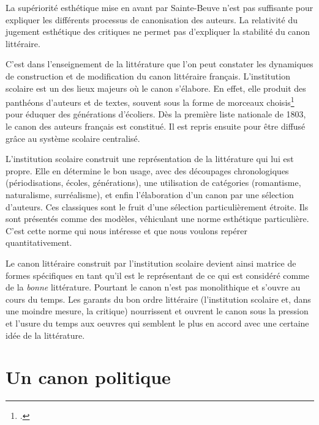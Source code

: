 La supériorité esthétique mise en avant par Sainte-Beuve n'est pas suffisante pour expliquer les différents processus de canonisation des auteurs. La relativité du jugement esthétique des critiques ne permet pas d'expliquer la stabilité du canon littéraire. 

C'est dans l'enseignement de la littérature que l'on peut constater les dynamiques de construction et de modification du canon littéraire français. L'institution scolaire est un des lieux majeurs où le canon s'élabore. En effet, elle produit des panthéons d'auteurs et de textes, souvent sous la forme de morceaux choisis\footcites{jey_litterature_1998} pour éduquer des générations d'écoliers. Dès la première liste nationale de 1803, le canon des auteurs français est constitué. Il est repris ensuite pour être diffusé grâce au système scolaire centralisé.

L’institution scolaire construit une représentation de la littérature qui lui est propre. Elle en détermine le bon usage, avec des découpages chronologiques (périodisations, écoles, générations), une utilisation de catégories (romantisme, naturalisme, surréalisme), et enfin l'élaboration d’un canon par une sélection d’auteurs. Ces classiques sont le fruit d’une sélection particulièrement étroite. Ils sont présentés comme des modèles, véhiculant une norme esthétique particulière. C'est cette norme qui nous intéresse et que nous voulons repérer quantitativement.

Le canon littéraire construit par l'institution scolaire devient ainsi matrice de formes spécifiques en tant qu'il est le représentant de ce qui est considéré comme de la \textit{bonne} littérature. Pourtant le canon n'est pas monolithique et s'ouvre au cours du temps. Les garants du bon ordre littéraire (l'institution scolaire et, dans une moindre mesure, la critique) nourrissent et ouvrent le canon sous la pression et l'usure du temps aux oeuvres qui semblent le plus en accord avec une certaine idée de la littérature. 

\section{Un canon politique}

